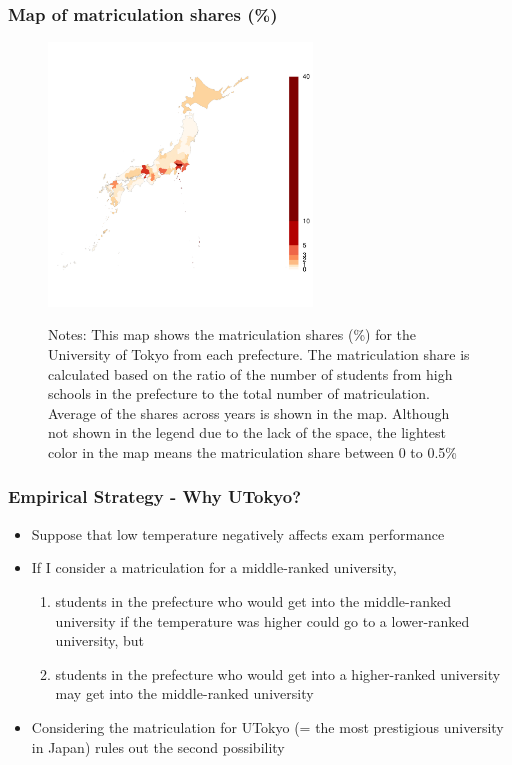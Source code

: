 \documentclass[10pt, pdfmx,hiresbb]{beamer}
\begin{document}
\begin{frame}\frametitle{Map of matriculation shares (\%)}
  \begin{center}
    \begin{figure}
      \includegraphics[width=7cm]{../Output/images/admission_map.pdf}
      \tiny
      \begin{tablenotes}
      \item Notes:
        This map shows the matriculation shares (\%) for the University of Tokyo from each prefecture.
        The matriculation share is calculated based on the ratio of the number of students from high schools in the prefecture to the total number of matriculation.
        Average of the shares across years is shown in the map.
        Although not shown in the legend due to the lack of the space, the lightest color in the map means the matriculation share between 0 to 0.5\% 
      \end{tablenotes}
    \end{figure}
  \end{center}
\end{frame}

\begin{frame}\frametitle{Empirical Strategy - Why UTokyo?}
  \begin{itemize}
    \item Suppose that low temperature negatively affects exam performance
    \item If I consider a matriculation for a middle-ranked university,
      \begin{enumerate}
        \item students in the prefecture who would get into the middle-ranked university if the temperature was higher could go to a lower-ranked university, but
        \item students in the prefecture who would get into a higher-ranked university may get into the middle-ranked university
      \end{enumerate}
    \item Considering the matriculation for UTokyo (= the most prestigious university in Japan) rules out the second possibility
  \end{itemize}
\end{frame}
\end{document}
